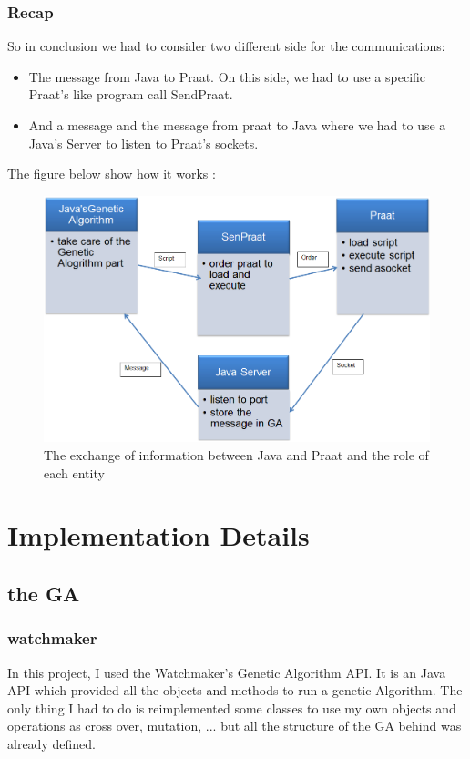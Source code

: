 \documentclass[12pt]{report}
\begin{document}
\section{Recap}
So in conclusion we had to consider two different side for the communications:
\begin{itemize}
\item The message from Java to Praat. On this side, we had to use a specific Praat's like program call SendPraat.
\item And a message and the message from praat to Java where we had to use a Java's Server to listen to Praat's sockets.
\end{itemize}


The figure below show how it works :
\begin{figure}
\begin{center}
\includegraphics[scale=0.6]{resources/architecture.png} 
\end{center}
\caption{The exchange of information between Java and Praat and the role of each entity}
\label{architecture}
\end{figure}

\part{Implementation Details}
\chapter{the GA}
\section{watchmaker}
In this project, I used the Watchmaker's Genetic Algorithm API\cite{ref}. It is an Java API which provided all the objects and methods to run a genetic Algorithm. The only thing I had to do is reimplemented some classes to use my own objects and operations as cross over, mutation, ... but all the structure of the GA behind was already defined.
\end{document}
